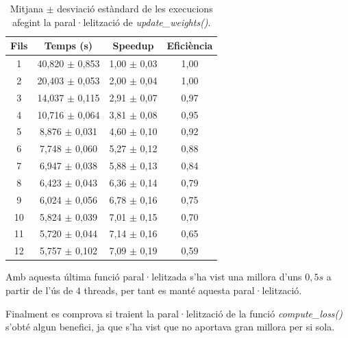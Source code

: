 \documentclass{article}
\begin{document}
\begin{table}[H]
\centering
\begin{tabular}{|c|c|c|c|}
\hline
\textbf{Fils} & \textbf{Temps (s)} & \textbf{Speedup} & \textbf{Eficiència} \\ \hline
1 & 40,820 $\pm$ 0,853 & 1,00 $\pm$ 0,03 & 1,00 \\ \hline
2 & 20,403 $\pm$ 0,053 & 2,00 $\pm$ 0,04 & 1,00 \\ \hline
3 & 14,037 $\pm$ 0,115 & 2,91 $\pm$ 0,07 & 0,97 \\ \hline
4 & 10,716 $\pm$ 0,064 & 3,81 $\pm$ 0,08 & 0,95 \\ \hline
5 & 8,876 $\pm$ 0,031 & 4,60 $\pm$ 0,10 & 0,92 \\ \hline
6 & 7,748 $\pm$ 0,060 & 5,27 $\pm$ 0,12 & 0,88 \\ \hline
7 & 6,947 $\pm$ 0,038 & 5,88 $\pm$ 0,13 & 0,84 \\ \hline
8 & 6,423 $\pm$ 0,043 & 6,36 $\pm$ 0,14 & 0,79 \\ \hline
9 & 6,024 $\pm$ 0,056 & 6,78 $\pm$ 0,16 & 0,75 \\ \hline
10 & 5,824 $\pm$ 0,039 & 7,01 $\pm$ 0,15 & 0,70 \\ \hline
11 & 5,720 $\pm$ 0,044 & 7,14 $\pm$ 0,16 & 0,65 \\ \hline
12 & 5,757 $\pm$ 0,102 & 7,09 $\pm$ 0,19 & 0,59 \\ \hline
\end{tabular}
\caption{Mitjana $\pm$ desviació estàndard de les execucions afegint la paral·lelització de \textit{update\_weights()}.}
\label{tab:resultats8}
\end{table}

Amb aquesta última funció paral·lelitzada s'ha vist una millora d'uns $0,5s$ a partir de l'ús de $4$ threads, per tant es manté aquesta paral·lelització.

Finalment es comprova si traient la paral·lelització de la funció \textit{compute\_loss()} s'obté algun benefici, ja que s'ha vist que no aportava gran millora per si sola.
\end{document}
